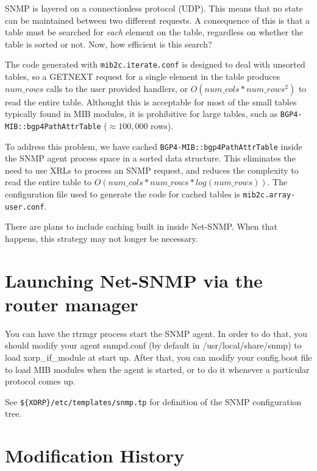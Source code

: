 \documentclass[11pt]{article}
\begin{document}
SNMP is layered on a connectionless protocol (UDP).  This means that no state
can be maintained between two different requests.  A consequence of this is
that a table must be searched for \emph{each} element on the table,
regardless on whether the table is sorted or not.  Now, how efficient is this
search?

The code generated with \texttt{mib2c.iterate.conf} is designed to deal with
unsorted tables, so a GETNEXT request for a single element in the table
produces $num\_rows$ calls to the user provided handlers, or
$O(num\_cols*num\_rows^{2})$ to read the entire table.  Althought this is
acceptable for most of the small tables typically found in MIB modules, it is
prohibitive for large tables, such as \texttt{BGP4-MIB::bgp4PathAttrTable}
($\approx100,000$ rows).  

To address this problem, we have cached \texttt{BGP4-MIB::bgp4PathAttrTable} 
inside the SNMP agent process space in a sorted data structure.  This
eliminates the need to use XRLs to process an SNMP request, and reduces the
complexity to read the entire table to $O(num\_cols*num\_rows*log(num\_rows))$.
The configuration file used to generate the code for cached tables is
\texttt{mib2c.array-user.conf}.

There are plans to include caching built in inside Net-SNMP.  When that
happens, this strategy may not longer be necessary. 

\section{Launching Net-SNMP via the router manager}

You can have the rtrmgr process start the SNMP agent.  In order to do that, you
should modify your agent snmpd.conf (by default in /usr/local/share/snmp) to
load xorp\_if\_module at start up. After that, you can modify your config.boot
file to load MIB modules when the agent is started, or to do it whenever a
particular protocol comes up. 

See \texttt{\$\{XORP\}/etc/templates/snmp.tp} for definition of the SNMP
configuration tree.



\appendix
\section{Modification History}
\end{document}
